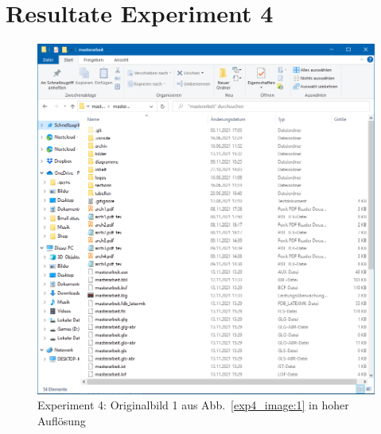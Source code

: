 \section{Resultate Experiment 4}
\label{sec:appendix:exp4}

\begin{figure} [ht]
  \centering
  \includegraphics[width=\textwidth]{bilder/result_exp4/3.png}

  \caption{Experiment 4: Originalbild 1 aus Abb.~\ref{exp4_image:1} in hoher Auflösung}
\end{figure}

